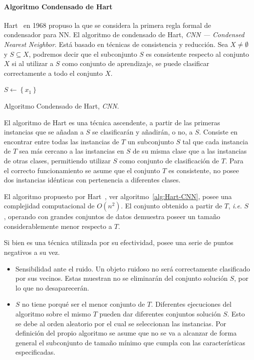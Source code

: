 \paragraph{Algoritmo Condensado de Hart}\label{paragraph:CNN}
\hfill \break
Hart~\cite{hart1968condensed} en 1968 propuso la que se considera la primera regla formal de condensador para NN. El algoritmo de condensado de Hart, \textit{CNN --- Condensed Nearest Neighbor}. Está basado en técnicas de consistencia y reducción. Sea $X \not= \emptyset$ y $S \subseteq X$, podremos decir que el subconjunto $S$ es consistente respecto al conjunto $X$ si al utilizar a $S$ como conjunto de aprendizaje, se puede clasificar correctamente a todo el conjunto $X$.

\begin{algorithm}[H]
  	\BlankLine
  $S \leftarrow \left\lbrace x_1 \right\rbrace$\\
	\caption{Algoritmo Condensado de Hart, \textit{CNN}.}\label{alg:Hart-CNN}
\end{algorithm}

El algoritmo de Hart es una técnica ascendente, a partir de las primeras instancias que se añadan a $S$ se clasificarán y añadirán, o no, a $S$. Consiste en encontrar entre todas las instancias de $T$ un subconjunto $S$ tal que cada instancia de $T$ sea más cercano a las instancias en $S$ de su misma clase que a las instancias de otras clases, permitiendo utilizar $S$ como conjunto de clasificación de $T$. Para el correcto funcionamiento se asume que el conjunto $T$ es consistente, no posee dos instancias idénticas con pertenencia a diferentes clases.

El algoritmo propuesto por Hart~\cite{hart1968condensed}, ver algoritmo~\ref{alg:Hart-CNN}, posee una complejidad computacional de $O(n^2)$. El conjunto obtenido a partir de $T$, \textit{i.e.} $S$, operando con grandes conjuntos de datos demuestra poseer un tamaño considerablemente menor respecto a $T$. 

Si bien es una técnica utilizada por su efectividad, posee una serie de puntos negativos a su vez.
\begin{itemize}
\item Sensibilidad ante el ruido. Un objeto ruidoso no será correctamente clasificado por sus vecinos. Estas muestran no se eliminarán del conjunto solución $S$, por lo que no desaparecerán.
\item $S$ no tiene porqué ser el menor conjunto de $T$. Diferentes ejecuciones del algoritmo sobre el mismo $T$ pueden dar diferentes conjuntos solución $S$. Esto se debe al orden aleatorio por el cual se seleccionan las instancias. Por definición del propio algoritmo se asume que no se va a alcanzar de forma general el subconjunto de tamaño mínimo que cumpla con las características especificadas.
\end{itemize}

